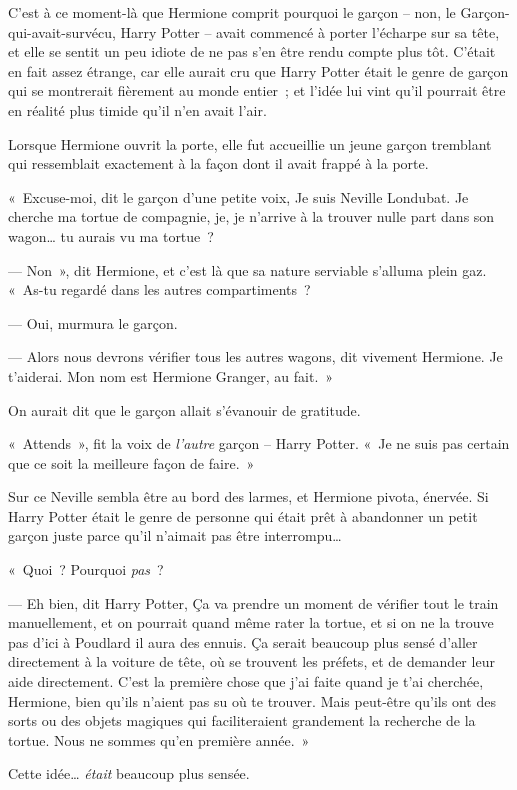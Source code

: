 C'est à ce moment-là que Hermione comprit pourquoi le garçon -- non, le Garçon-qui-avait-survécu, Harry Potter -- avait commencé à porter l'écharpe sur sa tête, et elle se sentit un peu idiote de ne pas s'en être rendu compte plus tôt. C'était en fait assez étrange, car elle aurait cru que Harry Potter était le genre de garçon qui se montrerait fièrement au monde entier~; et l'idée lui vint qu'il pourrait être en réalité plus timide qu'il n'en avait l'air.

Lorsque Hermione ouvrit la porte, elle fut accueillie un jeune garçon tremblant qui ressemblait exactement à la façon dont il avait frappé à la porte.

«~Excuse-moi, dit le garçon d'une petite voix, Je suis Neville Londubat. Je cherche ma tortue de compagnie, je, je n'arrive à la trouver nulle part dans son wagon… tu aurais vu ma tortue~?

--- Non~», dit Hermione, et c'est là que sa nature serviable s'alluma plein gaz. «~As-tu regardé dans les autres compartiments~?

--- Oui, murmura le garçon.

--- Alors nous devrons vérifier tous les autres wagons, dit vivement Hermione. Je t'aiderai. Mon nom est Hermione Granger, au fait.~»

On aurait dit que le garçon allait s'évanouir de gratitude.

«~Attends~», fit la voix de \emph{l'autre} garçon -- Harry Potter. «~Je ne suis pas certain que ce soit la meilleure façon de faire.~»

Sur ce Neville sembla être au bord des larmes, et Hermione pivota, énervée. Si Harry Potter était le genre de personne qui était prêt à abandonner un petit garçon juste parce qu'il n'aimait pas être interrompu…

«~Quoi~? Pourquoi \emph{pas}~?

--- Eh bien, dit Harry Potter, Ça va prendre un moment de vérifier tout le train manuellement, et on pourrait quand même rater la tortue, et si on ne la trouve pas d'ici à Poudlard il aura des ennuis. Ça serait beaucoup plus sensé d'aller directement à la voiture de tête, où se trouvent les préfets, et de demander leur aide directement. C'est la première chose que j'ai faite quand je t'ai cherchée, Hermione, bien qu'ils n'aient pas su où te trouver. Mais peut-être qu'ils ont des sorts ou des objets magiques qui faciliteraient grandement la recherche de la tortue. Nous ne sommes qu'en première année.~»

Cette idée… \emph{était} beaucoup plus sensée.

